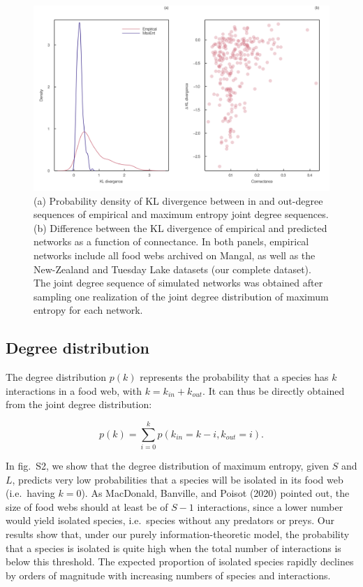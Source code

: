 \documentclass[10pt,oneside]{article}
\makeatletter
\def\maxwidth{\ifdim\Gin@nat@width>\linewidth\linewidth
\else\Gin@nat@width\fi}
\let\Oldincludegraphics\includegraphics
\renewcommand{\includegraphics}[1]{\Oldincludegraphics[width=\maxwidth]{#1}}
\makeatother
\begin{document}
\begin{figure}
\hypertarget{fig:kl_diverg}{%
\centering
\includegraphics{figures/kl_divergence.png}
\caption{(a) Probability density of KL divergence between in and
out-degree sequences of empirical and maximum entropy joint degree
sequences. (b) Difference between the KL divergence of empirical and
predicted networks as a function of connectance. In both panels,
empirical networks include all food webs archived on Mangal, as well as
the New-Zealand and Tuesday Lake datasets (our complete dataset). The
joint degree sequence of simulated networks was obtained after sampling
one realization of the joint degree distribution of maximum entropy for
each network.}\label{fig:kl_diverg}
}
\end{figure}

\hypertarget{degree-distribution}{%
\subsection{Degree distribution}\label{degree-distribution}}

The degree distribution \(p(k)\) represents the probability that a
species has \(k\) interactions in a food web, with
\(k = k_{in} + k_{out}\). It can thus be directly obtained from the
joint degree distribution:

\[p(k) = \sum_{i=0}^k p(k_{in} = k - i, k_{out} = i).\]

In fig.~S2, we show that the degree distribution of maximum entropy,
given \(S\) and \(L\), predicts very low probabilities that a species
will be isolated in its food web (i.e.~having \(k = 0\)). As MacDonald,
Banville, and Poisot (2020) pointed out, the size of food webs should at
least be of \(S-1\) interactions, since a lower number would yield
isolated species, i.e.~species without any predators or preys. Our
results show that, under our purely information-theoretic model, the
probability that a species is isolated is quite high when the total
number of interactions is below this threshold. The expected proportion
of isolated species rapidly declines by orders of magnitude with
increasing numbers of species and interactions.
\end{document}
